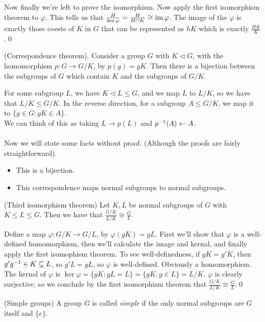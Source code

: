\documentclass{article}
\newcommand{\nrm}{\triangleleft}
\begin{document}
\begin{itemize}
Now finally we're left to prove the isomorphism. Now apply the first isomorphism theorem to $ \varphi $. This tells us that $ \frac H{\ker \varphi}=\frac H {H\cap K}\cong \operatorname{im} \varphi $. The image of the $ \varphi $ is exactly those coests of $ K $ in $ G $ that can be represented as $ hK $ which is exactly $ \frac{HK}K $.\qed\\
\begin{theorem}
	(Correspondence theorem). Consider a group $ G $ with $ K\nrm G $, with the homomorphism $ p:G\to G/K $, by $ p(g)=gK $. Then there is a bijection between the subgroups of $ G $ which contain $ K $ and the subgroups of $ G/K $.
\end{theorem}
\pf For some subgroup $ L $, we have $ K\nrm L \le G $, and we map $ L $ to $ L/K $, so we have that $ L/K\le G/K $. In the reverse direction, for a subgroup $ A\le G/K $, we map it to $ \{g\in G: gK\in A\} $.\\
We can think of this as taking $ L\to p(L) $ and $ {p}^{-1}(A)\leftarrow A $.
\\\\ Now we will state some facts without proof. (Although the proofs are fairly straightforward).
\begin{itemize}
	\item This is a bijection.
	\item This correspondence maps normal subgroups to normal subgroups.
\end{itemize}
\begin{theorem}
	(Third isomorphism theorem) Let $ K,L $ be normal subgroups of $ G $ with $ K\le L\le G $. Then we have that $ \frac{G/K}{L/K}\cong \frac GL $.
\end{theorem}
\pf Define a map $ \varphi: G/K \rightarrow G/L $, by $ \varphi(gK)=gL $. First we'll show that $ \varphi $ is a well-defined homomorphism, then we'll calculate the image and kernal, and finally apply the first isomophism theorem. To see well-definedness, if $ gK=g'K $, then $ g'{g}^{-1}\in K\subseteq L $, so $ g'L=gL $, so $ \varphi $ is well-defined. Obviously a homomorphism.\\
The kernal of $ \varphi $ is $ \ker \varphi = \{gK:gL=L\} =\{gK: g\in L\} = L/K $. $ \varphi $ is clearly surjective, so we conclude by the first isomorphism theorem that $ \frac{G/K}{L/K}\cong \frac GL $.\qed
\begin{definition}
	(Simple groups) A group $ G $ is called \textit{simple} if the only normal subgroups are $ G $ itself and $ \{ e \} $.
\end{definition}

\end{itemize}
\end{document}
